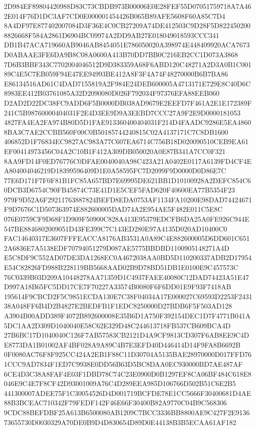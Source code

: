 \documentclass[UTF8,fontset=fandol,zihao=-4,a4paper]{ctexart}
\begin{document}
{{2D984EF89804420988D83C73CBDB973B00006E0E28FEF55D07051759718A7A462E014F76D1DC3AF7CD0E000001454426B065B89AFE5608F60A85C7D4
8A4DF97E877402007084D3F36E4C0CB27209A74DE412503C9D28F5D8224502008826668F584A2861D6904BC09974A2DD9AB27E018049018593CCC341
DB1B47ACA719660AB9046AB8454051E786050020A398974E448409920ACA7673D0ABAAE3FE6DA9B8C08A0600A413B70DD7BB0C216EB2CC1D073A3868
7D6B3BBF343C7702004046512D9D383359A68F6ABD120C48271A2D3A0B1C00189C4E5C7EB059F94E47EE94993BE412A8F3F4A74F48270000B6B7BA86
E86134516AD61C4DAD7155819A2F984E24DEB600005A4713171E729E8C40D6C8983EE412B03761085A32D2090080D026F792034F97376EFA88EEB060
D2AD2D22DC38FC9ADD6F5B0000DB038AD9679E2EEFD7F461A2E1E172389F241C5B98760000404031F2E4D3EE9D9A3EEBD7CCC27A9F2E9D0000181053
4827FA4EA2FA974B80D5D1FAE913360400404031F214D4FAADC9286E5EA48608BA3C7AE2CCBB560F00C0B50185744240815C02A4137171C7C8DB1600
406852D1F76834EC9827AC983A77C607EA6714C756B18D020090510CEB9EA61EF00414973456C04A2C10B1F412A309DB050020A0E87B341A7CC0F321
8AA9FD14F0ED76776C0DFAE0040040A98C423A21A0402E0117A6139FD4CF4EA804004046219D18399596409D1E0A58595FC7D2099F9D0000D0D86E7C
77E6D171F7F0F81B1FC85A657BD7E69995DE621BB1D10100928A2DEFC854C60DCB3D6754C90FB45874C73E41D1E5CEF5FAD620F40600EA77B5354F23
979F9D52A6F29211763887824BEFD8EDA0753AF1134FA10200E98DAD74424671F9D7676C1D507363974E882600005DAD74A2E954AE5F482E011C5E8C
076E0759CF9D68F1D909F50900C828A413E95379EDCFB6DA25A0FE926C944E547BE8846802009051D43FE399C7C143ED280E97A4135D020AD10400C0
FAC14640317E3607FFFEACCA8176AB3531A0A89C4E882600005D6DD601C6512A6836E7A5138EDF70794051279D087AE5775BBDBD1100905148271A4D
E5C8DF9C552AD07DE3DA1268EC0A4672038AA0BD5D110200337ADB2D17954E54C82826FD988B228119BB5668AAD02B9D78BD51DB1E0100E9C457573C
76C0339B03D209A10448278AA71359D1C4937FAEE40080C12DAD74423A51E47D997A18B65FC5DD17CE7F70227A33574B0080F6F6DD01E9F93F7418AB
195614F9CBCD2F5C9851ECDA130E7C38F04034A17E000027C69593D2253F243138A048FF6B4D2B4827E2BEDFB1F1EDC8250000D27BDB6F5F503AD128
A3904B00ADD389F4072B892600008E35B6D1A750F392154DEC1D7F4771B041A5DC1AA2D309D1040040E58C62E329D48C244613718FB537CB609BCA4D
27B6BC17D1040040C126F7AB57583CB2121D4A9CF9813CD307F6AB8EE9C4DE8773DA1B01002AF4BF028A9A89C4B7E3EFD40D446414D14F9FA8B6692B
0F0080AC76F8F925CC424A2EB1F88C11D30704A5135BAE28970000D017FFD761CCC9AD7834F1ED7C9938E0DD56B63D5BC8DAA0EC930000BD7AE487AF
6CE4D3C38A8FAF4E03F1DBD78C74C23E0900D0B1297EF8CA06BF484C618E8046E9C4E7F8CF42D93001009A76C4D289EEA985D106766D502B51C6E2B5
441300007ADEE75F1C30054526D4D001719BCFDE78E1CC5666F30400681D4AE88B3BCEAC710342F79FEDF142F46E66F30400B82A9770C04B9C568306
9CDC88BEFDBF25A613B6500080AB1209C7BCC3336BB8800AE9C427F2E913673655730D0030329A70DE0B9D4D830654D89D0E44138B3B5ECAA61AF182
}}
\end{document}
